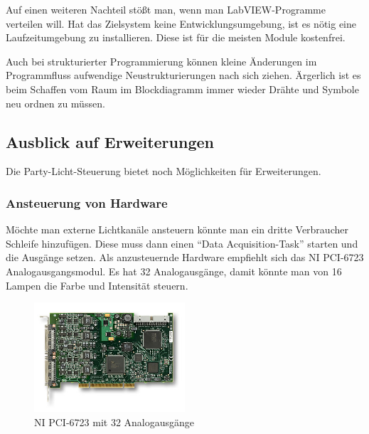 Auf einen weiteren Nachteil stößt man, wenn man LabVIEW-Programme verteilen will. Hat das Zielsystem keine Entwicklungsumgebung, ist es nötig eine Laufzeitumgebung zu installieren. Diese ist für die meisten Module kostenfrei.

Auch bei strukturierter Programmierung können kleine Änderungen im Programmfluss   aufwendige Neustrukturierungen nach sich ziehen. Ärgerlich ist es beim Schaffen vom Raum im Blockdiagramm immer wieder Drähte und Symbole neu ordnen zu müssen.

	
	
\subsection{Ausblick auf Erweiterungen}
Die Party-Licht-Steuerung bietet noch Möglichkeiten für Erweiterungen.

\subsubsection{Ansteuerung von Hardware}
Möchte man externe Lichtkanäle ansteuern könnte man ein dritte Verbraucher Schleife hinzufügen. Diese muss dann einen "`Data Acquisition-Task"' starten und die Ausgänge setzen. Als anzusteuernde Hardware empfiehlt sich das NI PCI-6723 Analogausgangsmodul. Es hat 32 Analogausgänge, damit könnte man von 16 Lampen die Farbe und Intensität steuern.\cite{ni-pci}

	\begin{figure}[h!]
	\centering
		\includegraphics[width=0.5\textwidth]{Pics/pci6723.jpg}
	\caption{NI PCI-6723 mit 32 Analogausgänge \cite{ni-pci} }
	\label{fig:a7}
	\end{figure}


